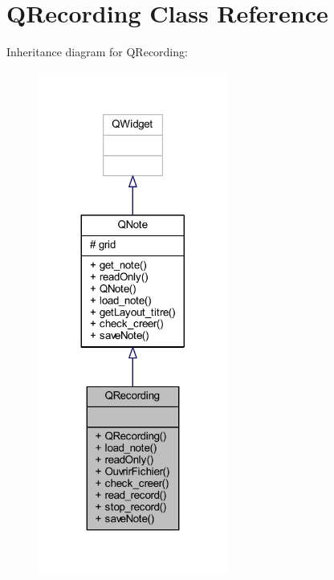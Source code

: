 \hypertarget{class_q_recording}{}\section{Q\+Recording Class Reference}
\label{class_q_recording}


Inheritance diagram for Q\+Recording\+:
\nopagebreak
\begin{figure}[H]
\begin{center}
\leavevmode
\includegraphics[width=176pt]{class_q_recording__inherit__graph}
\end{center}
\end{figure}


